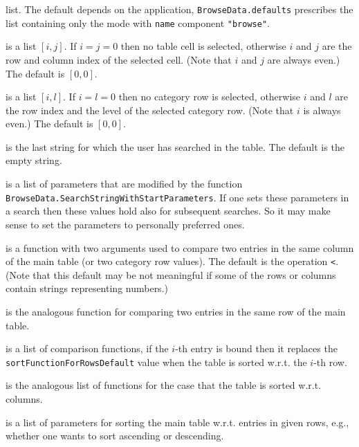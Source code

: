 \documentclass[a4paper,11pt]{report}
\begin{document}
{{{\begin{description}
list. The default depends on the application, \texttt{BrowseData.defaults} prescribes the list containing only the mode with \texttt{name} component \texttt{"browse"}. 
\item[{\texttt{selectedEntry}}]  is a list $[ i, j ]$. If $i = j = 0$ then no table cell is selected, otherwise $i$ and $j$ are the row and column index of the selected cell. (Note that $i$ and $j$ are always even.) The default is $[ 0, 0 ]$. 
\item[{\texttt{selectedCategory}}]  is a list $[ i, l ]$. If $i = l = 0$ then no category row is selected, otherwise $i$ and $l$ are the row index and the level of the selected category row. (Note that $i$ is always even.) The default is $[ 0, 0 ]$. 
\item[{\texttt{searchString}}]  is the last string for which the user has searched in the table. The default
is the empty string. 
\item[{\texttt{searchParameters}}]  is a list of parameters that are modified by the function \texttt{BrowseData.SearchStringWithStartParameters}.  If one sets these parameters in a search then these values hold also for
subsequent searches. So it may make sense to set the parameters to personally
preferred ones. 
\item[{\texttt{sortFunctionForColumnsDefault}}]  is a function with two arguments used to compare two entries in the same
column of the main table (or two category row values). The default is the
operation \texttt{\texttt{}{\textless}}. (Note that this default may be not meaningful if some of the rows or columns
contain strings representing numbers.) 
\item[{\texttt{sortFunctionForRowsDefault}}]  is the analogous function for comparing two entries in the same row of the
main table. 
\item[{\texttt{sortFunctionsForRows}}]  is a list of comparison functions, if the $i$-th entry is bound then it replaces the \texttt{sortFunctionForRowsDefault} value when the table is sorted w.r.t. the $i$-th row. 
\item[{\texttt{sortFunctionsForColumns}}]  is the analogous list of functions for the case that the table is sorted
w.r.t. columns. 
\item[{\texttt{sortParametersForRowsDefault}}]  is a list of parameters for sorting the main table w.r.t. entries in given
rows, e.{\nobreakspace}g., whether one wants to sort ascending or descending. 

\end{description}}}}
\end{document}
